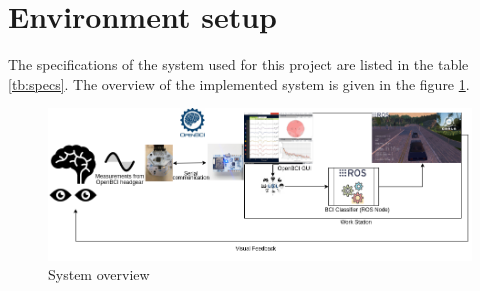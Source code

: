 \section{Environment setup}
The specifications of the system used for this project are listed in the table \ref{tb:specs}. The overview of the implemented system is given in the figure \ref{fig:MT_Overall}.

\begin{figure}[H] 
    \begin{center}
    \includegraphics[width=1.0\textwidth]{images/MT_Overall.png}
    \caption{System overview}
    \label{fig:MT_Overall}
\end{center}
\end{figure}

